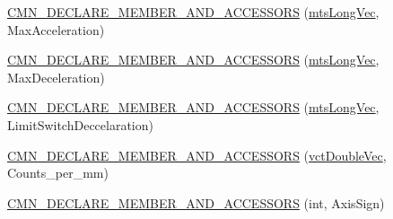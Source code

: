 {\bf }\par
\begin{DoxyCompactItemize}
\item 
\hyperlink{classprm_actuator_parameters_a84061877bd6e25f5d07f30a68f98bab5}{C\+M\+N\+\_\+\+D\+E\+C\+L\+A\+R\+E\+\_\+\+M\+E\+M\+B\+E\+R\+\_\+\+A\+N\+D\+\_\+\+A\+C\+C\+E\+S\+S\+O\+R\+S} (\hyperlink{mts_vector_8h_a3e011934ab1b5774f640a7bb70d9a672}{mts\+Long\+Vec}, Max\+Acceleration)
\end{DoxyCompactItemize}

{\bf }\par
\begin{DoxyCompactItemize}
\item 
\hyperlink{classprm_actuator_parameters_a5caffa85570f6eb8cff5035d0e1f8dc6}{C\+M\+N\+\_\+\+D\+E\+C\+L\+A\+R\+E\+\_\+\+M\+E\+M\+B\+E\+R\+\_\+\+A\+N\+D\+\_\+\+A\+C\+C\+E\+S\+S\+O\+R\+S} (\hyperlink{mts_vector_8h_a3e011934ab1b5774f640a7bb70d9a672}{mts\+Long\+Vec}, Max\+Deceleration)
\end{DoxyCompactItemize}

{\bf }\par
\begin{DoxyCompactItemize}
\item 
\hyperlink{classprm_actuator_parameters_a507bd11f4dd4e6b372d86427475758dc}{C\+M\+N\+\_\+\+D\+E\+C\+L\+A\+R\+E\+\_\+\+M\+E\+M\+B\+E\+R\+\_\+\+A\+N\+D\+\_\+\+A\+C\+C\+E\+S\+S\+O\+R\+S} (\hyperlink{mts_vector_8h_a3e011934ab1b5774f640a7bb70d9a672}{mts\+Long\+Vec}, Limit\+Switch\+Deccelaration)
\end{DoxyCompactItemize}

{\bf }\par
\begin{DoxyCompactItemize}
\item 
\hyperlink{classprm_actuator_parameters_a4f83620f433bad4daa1b94fe484a5323}{C\+M\+N\+\_\+\+D\+E\+C\+L\+A\+R\+E\+\_\+\+M\+E\+M\+B\+E\+R\+\_\+\+A\+N\+D\+\_\+\+A\+C\+C\+E\+S\+S\+O\+R\+S} (\hyperlink{vct_dynamic_vector_types_8h_ade4b3068c86fb88f41af2e5187e491c2}{vct\+Double\+Vec}, Counts\+\_\+per\+\_\+mm)
\end{DoxyCompactItemize}

{\bf }\par
\begin{DoxyCompactItemize}
\item 
\hyperlink{classprm_actuator_parameters_aa98f661afa1585c2342090247eaf9ca7}{C\+M\+N\+\_\+\+D\+E\+C\+L\+A\+R\+E\+\_\+\+M\+E\+M\+B\+E\+R\+\_\+\+A\+N\+D\+\_\+\+A\+C\+C\+E\+S\+S\+O\+R\+S} (int, Axis\+Sign)
\end{DoxyCompactItemize}

